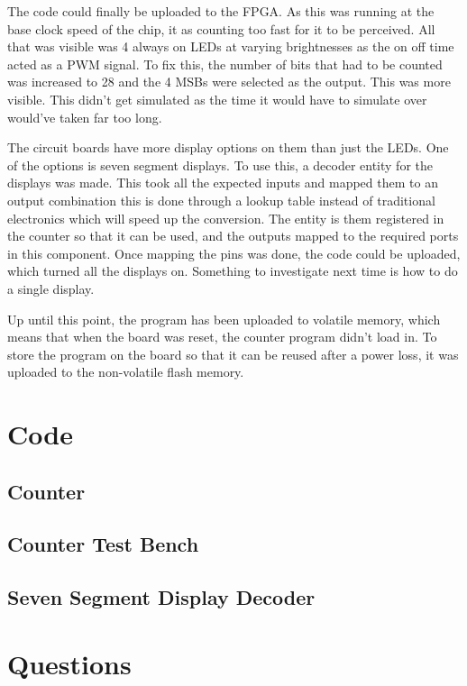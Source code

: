 \documentclass[a4paper, 12pt]{article}
\begin{document}
		\par
		The code could finally be uploaded to the FPGA. As this was running at the base clock speed of the chip, it as counting too fast for it to be perceived. All that was visible was 4 always on LEDs at varying brightnesses as the on off time acted as a PWM signal. To fix this, the number of bits that had to be counted was increased to 28 and the 4 MSBs were selected as the output. This was more visible. This didn't get simulated as the time it would have to simulate over would've taken far too long. 
		\par
		The circuit boards have more display options on them than just the LEDs. One of the options is seven segment displays. To use this, a decoder entity for the displays was made. This took all the expected inputs and mapped them to an output combination this is done through a lookup table instead of traditional electronics which will speed up the conversion. The entity is them registered in the counter so that it can be used, and the outputs mapped to the required ports in this component. Once mapping the pins was done, the code could be uploaded, which turned all the displays on. Something to investigate next time is how to do a single display. 
		\par
		Up until this point, the program has been uploaded to volatile memory, which means that when the board was reset, the counter program didn't load in. To store the program on the board so that it can be reused after a power loss, it was uploaded to the non-volatile flash memory. 

	\section{Code}
		\subsection{Counter}
			
		\subsection{Counter Test Bench}
			
		\subsection{Seven Segment Display Decoder} 
			
	\section{Questions}
\end{document}
